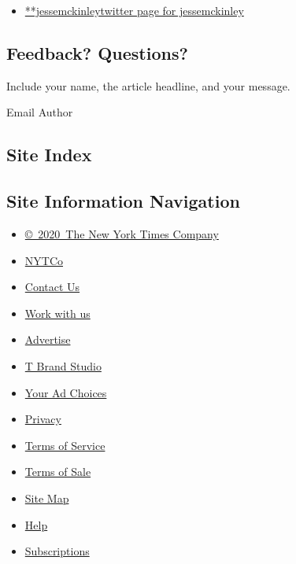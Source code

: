 \begin{itemize}
\tightlist
\item
  \href{https://twitter.com/jessemckinley}{**jessemckinleytwitter page
  for jessemckinley}
\end{itemize}

\hypertarget{feedback-questions}{%
\subsection{Feedback? Questions?}\label{feedback-questions}}

Include your name, the article headline, and your message.

Email Author

\hypertarget{site-index}{%
\subsection{Site Index}\label{site-index}}

\hypertarget{site-information-navigation}{%
\subsection{Site Information
Navigation}\label{site-information-navigation}}

\begin{itemize}
\tightlist
\item
  \href{https://help.nytimes.com/hc/en-us/articles/115014792127-Copyright-notice}{©~2020~The
  New York Times Company}
\end{itemize}

\begin{itemize}
\tightlist
\item
  \href{https://www.nytco.com/}{NYTCo}
\item
  \href{https://help.nytimes.com/hc/en-us/articles/115015385887-Contact-Us}{Contact
  Us}
\item
  \href{https://www.nytco.com/careers/}{Work with us}
\item
  \href{https://nytmediakit.com/}{Advertise}
\item
  \href{http://www.tbrandstudio.com/}{T Brand Studio}
\item
  \href{https://www.nytimes.com/privacy/cookie-policy\#how-do-i-manage-trackers}{Your
  Ad Choices}
\item
  \href{https://www.nytimes.com/privacy}{Privacy}
\item
  \href{https://help.nytimes.com/hc/en-us/articles/115014893428-Terms-of-service}{Terms
  of Service}
\item
  \href{https://help.nytimes.com/hc/en-us/articles/115014893968-Terms-of-sale}{Terms
  of Sale}
\item
  \href{https://spiderbites.nytimes.com}{Site Map}
\item
  \href{https://help.nytimes.com/hc/en-us}{Help}
\item
  \href{https://www.nytimes.com/subscription?campaignId=37WXW}{Subscriptions}
\end{itemize}
